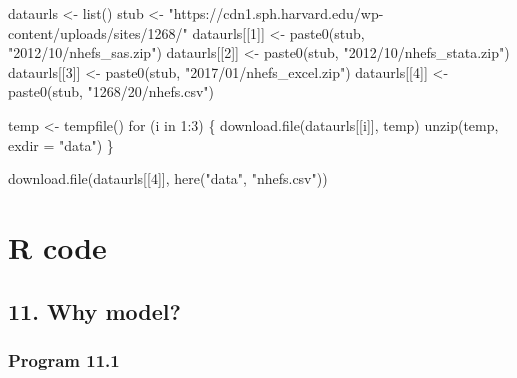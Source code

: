 \documentclass[
  10pt,
  a4paper,
]{book}
\newenvironment{Shaded}{\begin{snugshade}}{\end{snugshade}}
\newcommand{\AttributeTok}[1]{\textcolor[rgb]{0.40,0.45,0.13}{#1}}
\newcommand{\ControlFlowTok}[1]{\textcolor[rgb]{0.00,0.46,0.62}{#1}}
\newcommand{\DecValTok}[1]{\textcolor[rgb]{0.68,0.00,0.00}{#1}}
\newcommand{\FunctionTok}[1]{\textcolor[rgb]{0.28,0.35,0.67}{#1}}
\newcommand{\NormalTok}[1]{\textcolor[rgb]{0.00,0.46,0.62}{#1}}
\newcommand{\OtherTok}[1]{\textcolor[rgb]{0.00,0.46,0.62}{#1}}
\newcommand{\SpecialCharTok}[1]{\textcolor[rgb]{0.37,0.37,0.37}{#1}}
\newcommand{\StringTok}[1]{\textcolor[rgb]{0.13,0.47,0.30}{#1}}
\begin{document}
\begin{Shaded}
\begin{Highlighting}[]
\NormalTok{dataurls }\OtherTok{\textless{}{-}} \FunctionTok{list}\NormalTok{()}
\NormalTok{stub }\OtherTok{\textless{}{-}} \StringTok{"https://cdn1.sph.harvard.edu/wp{-}content/uploads/sites/1268/"}
\NormalTok{dataurls[[}\DecValTok{1}\NormalTok{]] }\OtherTok{\textless{}{-}} \FunctionTok{paste0}\NormalTok{(stub, }\StringTok{"2012/10/nhefs\_sas.zip"}\NormalTok{)}
\NormalTok{dataurls[[}\DecValTok{2}\NormalTok{]] }\OtherTok{\textless{}{-}} \FunctionTok{paste0}\NormalTok{(stub, }\StringTok{"2012/10/nhefs\_stata.zip"}\NormalTok{)}
\NormalTok{dataurls[[}\DecValTok{3}\NormalTok{]] }\OtherTok{\textless{}{-}} \FunctionTok{paste0}\NormalTok{(stub, }\StringTok{"2017/01/nhefs\_excel.zip"}\NormalTok{)}
\NormalTok{dataurls[[}\DecValTok{4}\NormalTok{]] }\OtherTok{\textless{}{-}} \FunctionTok{paste0}\NormalTok{(stub, }\StringTok{"1268/20/nhefs.csv"}\NormalTok{)}

\NormalTok{temp }\OtherTok{\textless{}{-}} \FunctionTok{tempfile}\NormalTok{()}
\ControlFlowTok{for}\NormalTok{ (i }\ControlFlowTok{in} \DecValTok{1}\SpecialCharTok{:}\DecValTok{3}\NormalTok{) \{}
  \FunctionTok{download.file}\NormalTok{(dataurls[[i]], temp)}
  \FunctionTok{unzip}\NormalTok{(temp, }\AttributeTok{exdir =} \StringTok{"data"}\NormalTok{)}
\NormalTok{\}}

\FunctionTok{download.file}\NormalTok{(dataurls[[}\DecValTok{4}\NormalTok{]], }\FunctionTok{here}\NormalTok{(}\StringTok{"data"}\NormalTok{, }\StringTok{"nhefs.csv"}\NormalTok{))}
\end{Highlighting}
\end{Shaded}

\mainmatter

\part*{R code}\label{part-r-code}

\chapter*{11. Why model?}\label{why-model}

\section{Program 11.1}\label{program-11.1}
\end{document}

